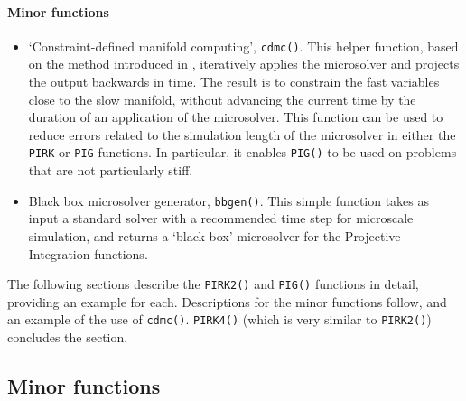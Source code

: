 \paragraph{Minor functions}
\begin{itemize}
\item `Constraint-defined manifold computing', \verb|cdmc()|.
This helper function, based on the method introduced in \cite{GearKevrekidis05},  iteratively applies the microsolver and projects the output backwards in time.
The result is to constrain the fast variables close to the slow manifold, without advancing the current time by the duration of an application of the microsolver.
This function can be used to reduce errors related to the simulation length of the microsolver in either the \verb|PIRK| or \verb|PIG| functions.
In particular, it enables \verb|PIG()| to be used on problems that are not particularly stiff.
\item Black box microsolver generator, \verb|bbgen()|.
This simple function takes as input a standard solver with a recommended time step for microscale simulation, and returns a `black box' microsolver for the Projective Integration functions.
\end{itemize}

The following sections describe the \verb|PIRK2()| and \verb|PIG()| functions in detail, providing an example for each.
Descriptions for the minor functions follow, and an example of the use of \verb|cdmc()|.
\verb|PIRK4()| (which is very similar to \verb|PIRK2()|) concludes the section.







\subsection{Minor functions}
\label{sec:extras}










